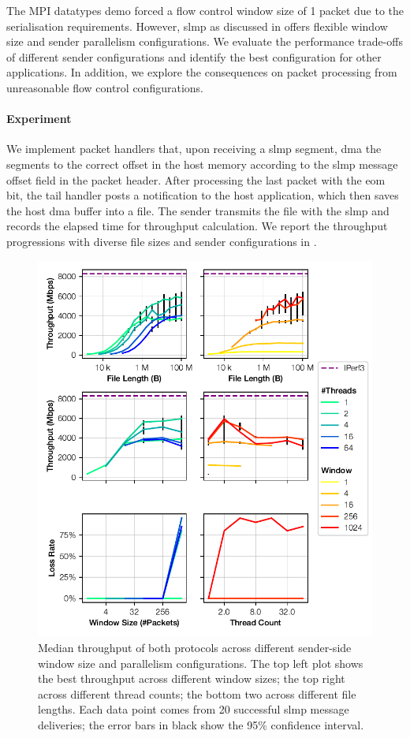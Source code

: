 The MPI datatypes demo forced a flow control window size of 1 packet due to the serialisation requirements.  However, \ac{slmp} as discussed in  offers flexible window size and sender parallelism configurations.  We evaluate the performance trade-offs of different sender configurations and identify the best configuration for other applications.  In addition, we explore the consequences on packet processing from unreasonable flow control configurations.

\paragraph{Experiment} We implement packet handlers that, upon receiving a \ac{slmp} segment, \ac{dma} the segments to the correct offset in the host memory according to the \ac{slmp} message offset field in the packet header.  After processing the last packet with the \ac{eom} bit, the tail handler posts a notification to the host application, which then saves the host \ac{dma} buffer into a file.  The sender transmits the file with the \ac{slmp} and records the elapsed time for throughput calculation.  We report the throughput progressions with diverse file sizes and sender configurations in .

\begin{figure}[tp]
    \centering
    \includegraphics{thesis/figures/slmp-tput.pdf}
    \caption{Median throughput of both protocols across different sender-side window size and parallelism configurations.  The top left plot shows the best throughput across different window sizes; the top right across different thread counts; the bottom two across different file lengths.  Each data point comes from 20 successful \ac{slmp} message deliveries; the error bars in black show the 95\% confidence interval.} \label{fig:slmp-tput}
\end{figure}

